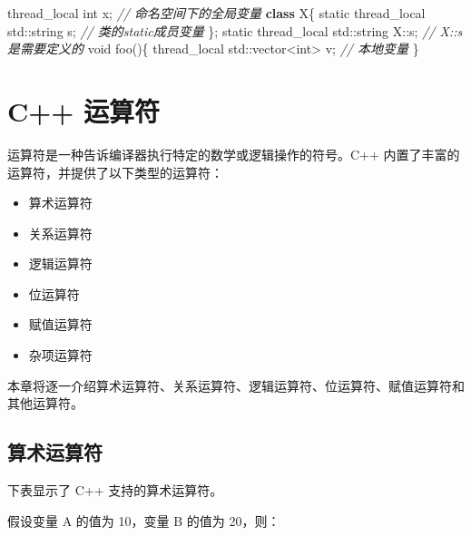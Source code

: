 \documentclass[
]{article}
\newenvironment{Shaded}{}{}
\newcommand{\AttributeTok}[1]{\textcolor[rgb]{0.49,0.56,0.16}{#1}}
\newcommand{\BuiltInTok}[1]{#1}
\newcommand{\CommentTok}[1]{\textcolor[rgb]{0.38,0.63,0.69}{\textit{#1}}}
\newcommand{\DataTypeTok}[1]{\textcolor[rgb]{0.56,0.13,0.00}{#1}}
\newcommand{\KeywordTok}[1]{\textcolor[rgb]{0.00,0.44,0.13}{\textbf{#1}}}
\newcommand{\NormalTok}[1]{#1}
\newcommand{\OperatorTok}[1]{\textcolor[rgb]{0.40,0.40,0.40}{#1}}
\providecommand{\tightlist}{%
  \setlength{\itemsep}{0pt}\setlength{\parskip}{0pt}}
\begin{document}
\begin{Shaded}
\begin{Highlighting}[]
\AttributeTok{thread\_local} \DataTypeTok{int}\NormalTok{ x}\OperatorTok{;}  \CommentTok{// 命名空间下的全局变量}
\KeywordTok{class}\NormalTok{ X}\OperatorTok{\{}
    \AttributeTok{static} \AttributeTok{thread\_local} \BuiltInTok{std::}\NormalTok{string}\OperatorTok{ }\NormalTok{s}\OperatorTok{;} \CommentTok{// 类的static成员变量}
\OperatorTok{\};}
\AttributeTok{static} \AttributeTok{thread\_local} \BuiltInTok{std::}\NormalTok{string}\OperatorTok{ }\NormalTok{X}\OperatorTok{::}\NormalTok{s}\OperatorTok{;}  \CommentTok{// X::s 是需要定义的}
\DataTypeTok{void}\NormalTok{ foo}\OperatorTok{()\{}
   \AttributeTok{thread\_local} \BuiltInTok{std::}\NormalTok{vector}\OperatorTok{\textless{}}\DataTypeTok{int}\OperatorTok{\textgreater{}}\NormalTok{ v}\OperatorTok{;}  \CommentTok{// 本地变量}
\OperatorTok{\}}
\end{Highlighting}
\end{Shaded}

\hypertarget{c-ux8fd0ux7b97ux7b26}{%
\section{C++ 运算符}\label{c-ux8fd0ux7b97ux7b26}}

运算符是一种告诉编译器执行特定的数学或逻辑操作的符号。C++
内置了丰富的运算符，并提供了以下类型的运算符：

\begin{itemize}
\tightlist
\item
  算术运算符
\item
  关系运算符
\item
  逻辑运算符
\item
  位运算符
\item
  赋值运算符
\item
  杂项运算符
\end{itemize}

本章将逐一介绍算术运算符、关系运算符、逻辑运算符、位运算符、赋值运算符和其他运算符。

\hypertarget{ux7b97ux672fux8fd0ux7b97ux7b26}{%
\subsection{算术运算符}\label{ux7b97ux672fux8fd0ux7b97ux7b26}}

下表显示了 C++ 支持的算术运算符。

假设变量 A 的值为 10，变量 B 的值为 20，则：
\end{document}
